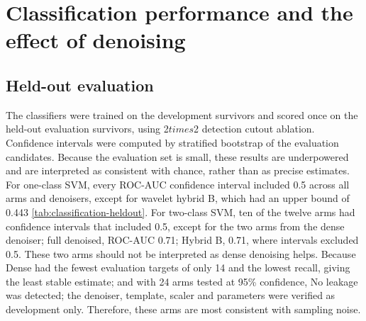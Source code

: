 \documentclass[ %
                    author={Daniel Page},
                supervisor={Dr. Andrew Calway},
                    degree={MSc},
                     title={Some Structural Guidelines for Data Science MSc Theses, Including Those With Long Titles that Run Across Multiple Lines on the Front Page},
                  subtitle={And those including an optional subtitle too, for good measure},
                      type={},
                      year={2021}]{dissertation}
\begin{document}
\section{Classification performance and the effect of denoising}
\subsection{Held-out evaluation}
The classifiers were trained on the development survivors and scored once on the held-out evaluation survivors, using 2$times$2 detection cutout ablation. Confidence intervals were computed by stratified bootstrap of the evaluation candidates. Because the evaluation set is small, these results are underpowered and are interpreted as consistent with chance, rather than as precise estimates.
For one-class SVM, every ROC-AUC confidence interval included 0.5 across all arms and denoisers, except for wavelet hybrid B, which had an upper bound of 0.443 \ref{tab:classification-heldout}. 
For two-class SVM, ten of the twelve arms had confidence intervals that included 0.5, except for the two arms from the dense denoiser; full denoised, ROC-AUC 0.71; Hybrid B, 0.71, where intervals excluded 0.5. 
These two arms should not be interpreted as dense denoising helps. Because Dense had the fewest evaluation targets of only 14 and the lowest recall, giving the least stable estimate; and with 24 arms tested at 95\% confidence,
No leakage was detected; the denoiser, template, scaler and parameters were verified as development only. Therefore, these arms are most consistent with sampling noise. 
\end{document}
